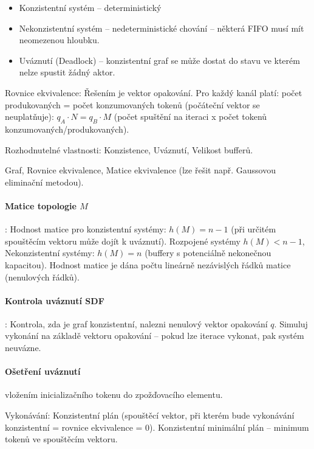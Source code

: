\documentclass[a4paper, 11pt]{report}
\begin{document}
\begin{itemize}
	\item Konzistentní systém -- deterministický
	\item Nekonzistentní systém -- nedeterministické chování -- některá FIFO musí mít neomezenou hloubku.
	\item Uváznutí (Deadlock) -- konzistentní graf se může dostat do stavu ve kterém nelze spustit žádný aktor.
\end{itemize}

Rovnice ekvivalence: Řešením je vektor opakování. Pro každý kanál platí: počet produkovaných  = počet konzumovaných tokenů (počáteční vektor se neuplatňuje): $q_A \cdot N = q_B \cdot M$ (počet spuštění na iteraci x počet tokenů konzumovaných/produkovaných).

Rozhodnutelné vlastnosti: Konzistence, Uváznutí, Velikost bufferů.

Graf, Rovnice ekvivalence, Matice ekvivalence (lze řešit např. Gaussovou eliminační metodou).

\paragraph{Matice topologie $M$}: Hodnost matice pro konzistentní systémy: $h(M) = n-1$ (při určitém spouštěcím vektoru může dojít k uváznutí). Rozpojené systémy $h(M) < n-1$, Nekonzistentní systémy: $h(M) = n$ (buffery s potenciálně nekonečnou kapacitou). Hodnost matice je dána počtu lineárně nezávislých řádků matice (nenulových řádků).

\paragraph{Kontrola uváznutí SDF}: Kontrola, zda je graf konzistentní, nalezni nenulový vektor opakování $q$. Simuluj vykonání na základě vektoru opakování -- pokud lze iterace vykonat, pak systém neuvázne.

\paragraph{Ošetření uváznutí} vložením inicializačního tokenu do zpožďovacího elementu.

Vykonávání: Konzistentní plán (spouštěcí vektor, při kterém bude vykonávání konzistentní = rovnice ekvivalence = 0). Konzistentní minimální plán -- minimum tokenů ve spouštěcím vektoru.
\end{document}
